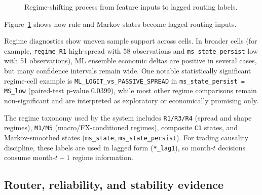 \documentclass[a4paper,12pt]{extarticle}
\begin{document}
\begin{figure}[htbp]
\centering
{}
\caption{Regime-shifting process from feature inputs to lagged routing labels.}
\label{fig:regime_process}
\end{figure}

Figure~\ref{fig:regime_process} shows how rule and Markov states become lagged routing inputs.

Regime diagnostics show uneven sample support across cells. In broader cells (for example, \texttt{regime\_R1} high-spread with 58 observations and \texttt{ms\_state\_persist} low with 51 observations), ML ensemble economic deltas are positive in several cases, but many confidence intervals remain wide. One notable statistically significant regime-cell example is \texttt{ML\_LOGIT\_vs\_PASSIVE\_SPREAD} in \texttt{ms\_state\_persist = MS\_low} (paired-test p-value 0.0399), while most other regime comparisons remain non-significant and are interpreted as exploratory or economically promising only.

The regime taxonomy used by the system includes \texttt{R1/R3/R4} (spread and shape regimes), \texttt{M1/M5} (macro/FX-conditioned regimes), composite \texttt{C1} states, and Markov-smoothed states (\texttt{ms\_state}, \texttt{ms\_state\_persist}). For trading causality discipline, these labels are used in lagged form (\texttt{*\_lag1}), so month-\(t\) decisions consume month-\(t-1\) regime information.

\subsection{Router, reliability, and stability evidence}
\end{document}
